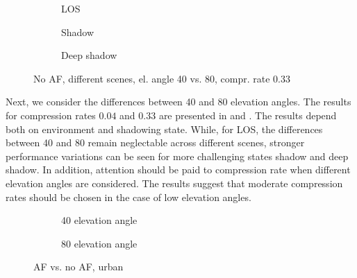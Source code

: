 \documentclass[conference]{IEEEtran}
\begin{document}
\begin{figure}[t!]
  \begin{subfigure}{.3\linewidth}
  \centering
  
  \vspace{-2.5em}
  \caption{LOS}
\end{subfigure}
\vspace{1ex}
\begin{subfigure}{.3\linewidth}
  \centering
  
  \vspace{-2.5em}
  \caption{Shadow}
\end{subfigure}
\vspace{1ex}
\begin{subfigure}{.3\linewidth}
  \centering
  
  \vspace{-2.5em}
  \caption{Deep shadow}
\end{subfigure}
\caption{No AF, different scenes, el. angle 40 vs. 80, compr. rate 0.33}
\label{fig:elevation_angles_0.33}
\end{figure}


Next, we consider the differences between 40 and 80 elevation angles. 
The results for compression rates $0.04$ and $0.33$ are presented in  and .
The results depend both on environment and shadowing state.
While, for LOS, the differences between 40 and 80 remain neglectable across different scenes, 
stronger performance variations can be seen for more challenging states shadow and deep shadow.
In addition, attention should be paid to compression rate when different elevation angles are considered. 
The results suggest that moderate compression rates should be chosen in the case of low elevation angles.


\begin{figure}[t!]
  \begin{subfigure}{.45\linewidth}
  \centering
  
  \vspace{-2.5em}
  \caption{40 elevation angle}
\end{subfigure}
\vspace{1ex}
\begin{subfigure}{.45\linewidth}
  \centering
  
  \vspace{-2.5em}
  \caption{80 elevation angle}
\end{subfigure}
\caption{AF vs. no AF, urban}
\label{fig:af_vs_no_af}
\end{figure}
\end{document}
